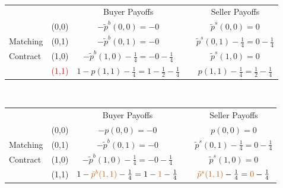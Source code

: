 \documentclass[12pt,letterpaper]{article}           %
\begin{document}
$ $

\newpage


\begin{table}[]
	\begin{tabular}{lcccc}
		&                            & Buyer Payoffs         &                       & Seller Payoffs        \\ \cline{3-3} \cline{5-5} 
& \multicolumn{1}{c|}{(0,0)} & \multicolumn{1}{c|}{$-\tilde{p}^b(0,0)= -0$} & \multicolumn{1}{c|}{} & \multicolumn{1}{c|}{$\tilde{p}^s(0,0)=  0$} \\ \cline{3-3} \cline{5-5} 
Matching & \multicolumn{1}{c|}{(0,1)} & \multicolumn{1}{c|}{$-\tilde{p}^b(0,1)= -0$} & \multicolumn{1}{c|}{} & \multicolumn{1}{c|}{$\tilde{p}^s(0,1) -\frac{1}{4}= 0 -\frac{1}{4}$}  \\ \cline{3-3} \cline{5-5} 
Contract& \multicolumn{1}{c|}{(1,0)} & \multicolumn{1}{c|}{$ -\tilde{p}^b(1,0) - \frac{1}{4}= - 0 - \frac{1}{4}$} & \multicolumn{1}{c|}{} & \multicolumn{1}{c|}{$\tilde{p}^s(1,0)=  0$} \\ \cline{3-3} \cline{5-5} 
		& \multicolumn{1}{c|}{\textcolor{red}{(1,1)}} & \multicolumn{1}{c|}{$  1 -p(1,1) - \frac{1}{4} = 1 - \frac{1}{2}- \frac{1}{4}$} & \multicolumn{1}{c|}{} & \multicolumn{1}{c|}{$ p(1,1) - \frac{1}{4}= \frac{1}{2}- \frac{1}{4}$} \\ \cline{3-3} \cline{5-5} 
	\end{tabular}
\end{table}


$ $

\newpage


\begin{table}[]
	\begin{tabular}{lcccc}
		&                            & Buyer Payoffs         &                       & Seller Payoffs        \\ \cline{3-3} \cline{5-5} 
& \multicolumn{1}{c|}{(0,0)} & \multicolumn{1}{c|}{$-p(0,0)= -0$} & \multicolumn{1}{c|}{} & \multicolumn{1}{c|}{$p(0,0)=  0$} \\ \cline{3-3} \cline{5-5} 
Matching & \multicolumn{1}{c|}{(0,1)} & \multicolumn{1}{c|}{$-\tilde{p}^b(0,1)= -0$} & \multicolumn{1}{c|}{} & \multicolumn{1}{c|}{$\tilde{p}^s(0,1) -\frac{1}{4}= 0 -\frac{1}{4}$}  \\ \cline{3-3} \cline{5-5} 
Contract& \multicolumn{1}{c|}{(1,0)} & \multicolumn{1}{c|}{$ -\tilde{p}^b(1,0) - \frac{1}{4}= - 0 - \frac{1}{4}$} & \multicolumn{1}{c|}{} & \multicolumn{1}{c|}{$\tilde{p}^s(1,0)=  0$} \\ \cline{3-3} \cline{5-5}  
		& \multicolumn{1}{c|}{(1,1)} & \multicolumn{1}{c|}{$1 -\textcolor{red}{\tilde{p}^b(1,1)} - \frac{1}{4}= 1 - \textcolor{red}{1} - \frac{1}{4}$} & \multicolumn{1}{c|}{} & \multicolumn{1}{c|}{$ \textcolor{red}{\tilde{p}^s(1,1)} - \frac{1}{4}=\textcolor{red}{0} - \frac{1}{4}$} \\ \cline{3-3} \cline{5-5} 
	\end{tabular}
\end{table}
\end{document}
